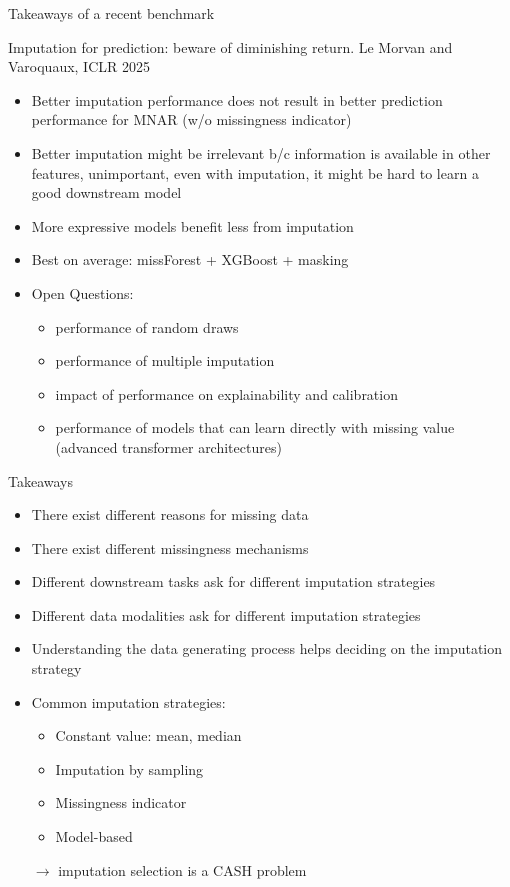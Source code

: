\documentclass[11pt,compress,t,notes=noshow, xcolor=table]{beamer}
\begin{document}
\begin{frame}{Takeaways of a recent benchmark}

Imputation for prediction: beware of diminishing return. Le Morvan and Varoquaux, ICLR 2025 

\begin{itemize}
    \item Better imputation performance does not result in better prediction performance for MNAR (w/o missingness indicator)
    \item Better imputation might be irrelevant b/c information is available in other features, unimportant, even with imputation, it might be hard to learn a good downstream model
    \item More expressive models benefit less from imputation
    \item Best on average: missForest + XGBoost + masking
    \item Open Questions:
    \begin{itemize}
        \item performance of random draws
        \item performance of multiple imputation
        \item impact of performance on explainability and calibration
        \item performance of models that can learn directly with missing value (advanced transformer architectures)
    \end{itemize}
\end{itemize}
    
\end{frame}

\begin{frame}{Takeaways}
    \vfill
    \begin{itemize}
        \item There exist different reasons for missing data
        \item There exist different missingness mechanisms
        \item Different downstream tasks ask for different imputation strategies
        \item Different data modalities ask for different imputation strategies
        \item Understanding the data generating process helps deciding on the imputation strategy
        \item Common imputation strategies:
        \begin{itemize}
            \item Constant value: mean, median
            \item Imputation by sampling
            \item Missingness indicator
            \item Model-based
        \end{itemize}
        $\rightarrow$ imputation selection is a CASH problem
    \end{itemize}
    \vfill
\end{frame}

\endlecture
\end{document}
